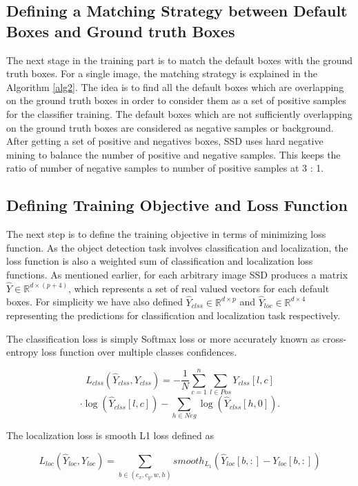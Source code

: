 \documentclass[conference]{IEEEtran}
\begin{document}
\subsection{Defining a Matching Strategy between Default Boxes and Ground truth Boxes}
The next stage in the training part is to match the default boxes with the ground truth boxes. For a single image, the matching strategy is explained in the Algorithm \ref{alg2}. The idea is to find all the default boxes which are overlapping on the ground truth boxes in order to consider them as a set of positive samples for the classifier training. The default boxes which are not sufficiently overlapping on the ground truth boxes are considered as negative samples or background. After getting a set of positive and negatives boxes, SSD uses hard negative mining \cite{DBLP:journals/corr/ShrivastavaGG16} to balance the number of positive and negative samples. This keeps the ratio of number of negative samples to number of positive samples at 3 : 1. 

\subsection{Defining Training Objective and Loss Function}
The next step is to define the training objective in terms of minimizing loss function. As the object detection task involves classification and localization, the loss function is also a weighted sum of classification and localization loss functions. As mentioned earlier, for each arbitrary image SSD produces a matrix $\hat{Y} \in \mathbb{R}^{d \times (p+4)}$, which represents a set of real valued vectors for each default boxes. For simplicity we have also defined $\hat{Y}_{clss} \in \mathbb{R}^{d \times p}$ and $\hat{Y}_{loc} \in \mathbb{R}^{d \times 4}$ representing the predictions for classification and localization task respectively. 

The classification loss is simply Softmax loss or more accurately known as cross-entropy loss function over multiple classes confidences.

$$L_{clss}(\hat{Y}_{clss}, Y_{clss}) = - \frac{1}{N} \sum_{c=1}^{n} \sum_{l \in Pos} Y_{clss}[l,c] $$
$$\cdot \log(\hat{Y}_{clss}[l,c]) - \sum_{h \in Neg} \log(\hat{Y}_{clss}[h,0]).$$

The localization loss is smooth L1 loss \cite{DBLP:journals/corr/Girshick15} defined as 

$$L_{loc}(\hat{Y}_{loc}, Y_{loc}) = \sum_{b \in (c_x, c_y, w, h)} smooth_{L_1}(\hat{Y}_{loc}[b,:] - Y_{loc}[b,:])$$
\end{document}

